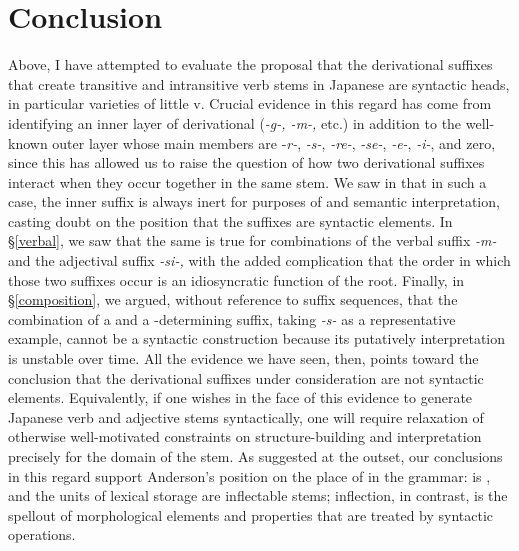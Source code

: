 \documentclass[output=paper,
modfonts
]{LSP/langsci}
\begin{document}
\section{Conclusion}\label{conclusiondeC}\label{sec:dechene:6}

Above, I have attempted to evaluate the proposal that the derivational
suffixes that create transitive and intransitive verb stems in Japanese
are syntactic heads, in particular varieties of little v. Crucial
evidence in this regard has come from identifying an inner layer of
derivational  (\textit{-g-, -m-,} etc.) in addition to the
well-known outer layer whose main members are -\textit{r-}, \textit{-s-},
\textit{-re-}, \textit{-se-}, \textit{-e-}, \textit{-i-}, and zero, since this
has allowed us to raise the question of how two derivational suffixes
interact when they occur together in the same stem. We saw in 
that in such a case, the inner suffix is always inert for purposes of
 and semantic interpretation, casting doubt on the
position that the suffixes are syntactic elements. In \S\ref{verbal}, we saw
that the same is true for combinations of the verbal suffix \textit{-m-}
and the adjectival suffix \textit{-si-,} with the added complication that
the order in which those two suffixes occur is an idiosyncratic function
of the root. Finally, in \S\ref{composition}, we argued, without reference to
suffix sequences, that the combination of a  and a
-determining suffix, taking  \textit{-s-} as a
representative example, cannot be a syntactic construction because its
putatively  interpretation is unstable over time. All the
evidence we have seen, then, points toward the conclusion that the
derivational suffixes under consideration are not syntactic elements.
Equivalently, if one wishes in the face of this evidence to generate
Japanese verb and adjective stems syntactically, one will require
relaxation of otherwise well-motivated constraints on structure-building
and interpretation precisely for the domain of the stem. As suggested at
the outset, our conclusions in this regard support Anderson's \citeyearpar[594]{anderson1982a} position on the place of  in the grammar:  is , and the units of lexical storage are inflectable stems;
inflection, in contrast, is the  spellout of morphological
elements and  properties that are treated by syntactic
operations.
\end{document}
